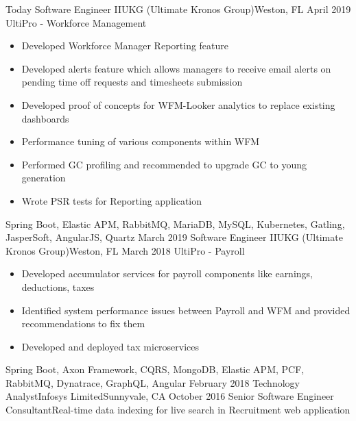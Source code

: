 
\begin{experiences}
  \consultantexperience
    {Today}   {Software Engineer II}{UKG (Ultimate Kronos Group)}{Weston, FL}
    {April 2019} {}{UltiPro - Workforce Management}
    {
                      \begin{itemize}
                        \item Developed Workforce Manager Reporting feature
                        \item Developed alerts feature which allows managers to receive email alerts on pending time off requests and timesheets submission
                        \item Developed proof of concepts for WFM-Looker analytics to replace existing dashboards         
                        \item Performance tuning of various components within WFM
                        \item Performed GC profiling and recommended to upgrade GC to young generation
                        \item Wrote PSR tests for Reporting application
                      \end{itemize}
                    }
                    {Spring Boot, Elastic APM, RabbitMQ, MariaDB, MySQL, Kubernetes, Gatling, JasperSoft, AngularJS, Quartz}
  \emptySeparator
  \consultantexperience
    {March 2019}   {Software Engineer II}{UKG (Ultimate Kronos Group)}{Weston, FL}
    {March 2018} {}{UltiPro - Payroll}
    {
                      \begin{itemize}
                        \item Developed accumulator services for payroll components like earnings, deductions, taxes
                        \item Identified system performance issues between Payroll and WFM and provided recommendations to fix them
                        \item Developed and deployed tax microservices
                      \end{itemize}
                    }
                    {Spring Boot, Axon Framework, CQRS, MongoDB, Elastic APM, PCF, RabbitMQ, Dynatrace, GraphQL, Angular}
  \emptySeparator
  \consultantexperience
  {February 2018}       {Technology Analyst}{Infosys Limited}{Sunnyvale, CA}
  {October 2016}      {Senior Software Engineer Consultant}{Real-time data indexing for live search in Recruitment web application}

\end{experiences}
